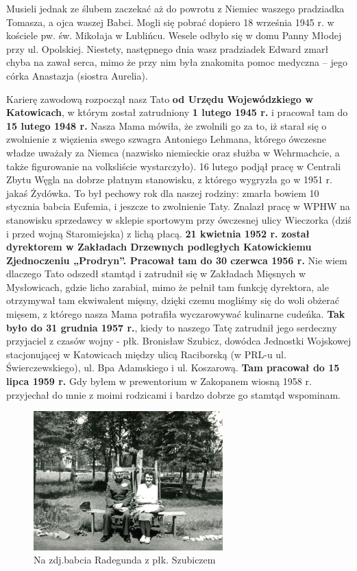 Musieli jednak ze ślubem zaczekać aż do powrotu z Niemiec waszego pradziadka Tomasza, a ojca waszej Babci. Mogli się pobrać dopiero 18 września 1945 r. w kościele pw. św. Mikołaja w Lublińcu. Wesele odbyło się w domu Panny Młodej przy ul. Opolskiej. Niestety, następnego dnia wasz pradziadek Edward zmarł chyba na zawał serca, mimo że przy nim była znakomita pomoc medyczna – jego córka Anastazja (siostra Aurelia).

Karierę zawodową rozpoczął nasz Tato \textbf{od Urzędu Wojewódzkiego w Katowicach}, w którym został zatrudniony \textbf{1 lutego 1945 r.} i pracował tam do \textbf{15 lutego 1948 r.} Nasza Mama mówiła, że zwolnili go za to, iż starał się o zwolnienie z więzienia swego szwagra Antoniego Lehmana, którego ówczesne władze uważały za Niemca (nazwisko niemieckie oraz służba w Wehrmachcie, a także figurowanie na volksliście wystarczyło). 16 lutego podjął pracę w Centrali Zbytu Węgla na dobrze płatnym stanowisku, z którego wygryzła go w 1951 r. jakaś Żydówka. To był pechowy rok dla naszej rodziny: zmarła bowiem 10 stycznia babcia Eufemia, i jeszcze to zwolnienie Taty. Znalazł pracę w WPHW na stanowisku sprzedawcy w sklepie sportowym przy ówczesnej ulicy Wieczorka (dziś i przed wojną Staromiejska) z lichą płacą. \textbf{21 kwietnia 1952 r. został dyrektorem w Zakładach Drzewnych podległych Katowickiemu Zjednoczeniu „Prodryn”. Pracował tam do 30 czerwca 1956 r.} Nie wiem dlaczego Tato odszedł stamtąd i zatrudnił się w Zakładach Mięsnych w Mysłowicach, gdzie licho zarabiał, mimo że pełnił tam funkcję dyrektora, ale otrzymywał tam ekwiwalent mięsny, dzięki czemu mogliśmy się do woli obżerać mięsem, z którego nasza Mama potrafiła wyczarowywać kulinarne cudeńka. \textbf{Tak było do 31 grudnia 1957 r.}, kiedy to naszego Tatę zatrudnił jego serdeczny przyjaciel z czasów wojny - płk. Bronisław Szubicz, dowódca Jednostki Wojskowej stacjonującej w Katowicach między ulicą Raciborską (w PRL-u ul. Świerczewskiego), ul. Bpa Adamskiego i ul. Koszarową. \textbf{Tam pracował do 15 lipca 1959 r.} Gdy byłem w prewentorium w Zakopanem wiosną 1958 r. przyjechał do mnie z moimi rodzicami i bardzo dobrze go stamtąd wspominam.
\begin{figure}[!h]
\begin{center}
\includegraphics[width=0.65\textwidth]{photo/radegunda_swierczynska_plk_szubicz.jpg}
\caption{Na zdj.babcia Radegunda z płk. Szubiczem}
\end{center}
\end{figure}

